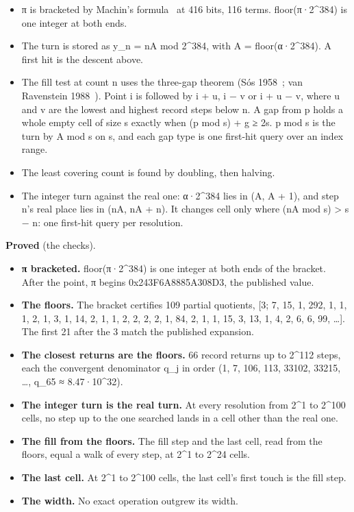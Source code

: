\begin{itemize}
\item π is bracketed by Machin's formula~\cite{src:Jones-1706} at 416 bits, 116 terms. floor(π·2\textasciicircum{}384) is one integer at both ends.
\item The turn is stored as y\_\allowbreak{}n = nA mod 2\textasciicircum{}384, with A = floor(α·2\textasciicircum{}384). A first hit is the descent above.
\item The fill test at count n uses the three-gap theorem (Sós 1958~\cite{src:S-s-1958}; van Ravenstein 1988~\cite{src:van-Ravenstein-1988}). Point i is followed by i + u, i − v or i + u − v, where u and v are the lowest and highest record steps below n. A gap from p holds a whole empty cell of size s exactly when (p mod s) + g ≥ 2s. p mod s is the turn by A mod s on s, and each gap type is one first-hit query over an index range.
\item The least covering count is found by doubling, then halving.
\item The integer turn against the real one: α·2\textasciicircum{}384 lies in (A, A + 1), and step n's real place lies in (nA, nA + n). It changes cell only where (nA mod s) > s − n: one first-hit query per resolution.
\end{itemize}

\textbf{Proved} (the checks).

\begin{itemize}
\item \textbf{π bracketed.} floor(π·2\textasciicircum{}384) is one integer at both ends of the bracket. After the point, π begins 0x243F6A8885A308D3, the published value.
\item \textbf{The floors.} The bracket certifies 109 partial quotients, [3; 7, 15, 1, 292, 1, 1, 1, 2, 1, 3, 1, 14, 2, 1, 1, 2, 2, 2, 2, 1, 84, 2, 1, 1, 15, 3, 13, 1, 4, 2, 6, 6, 99, …]. The first 21 after the 3 match the published expansion.
\item \textbf{The closest returns are the floors.} 66 record returns up to 2\textasciicircum{}112 steps, each the convergent denominator q\_\allowbreak{}j in order (1, 7, 106, 113, 33102, 33215, …, q\_\allowbreak{}65 ≈ 8.47·10\textasciicircum{}32).
\item \textbf{The integer turn is the real turn.} At every resolution from 2\textasciicircum{}1 to 2\textasciicircum{}100 cells, no step up to the one searched lands in a cell other than the real one.
\item \textbf{The fill from the floors.} The fill step and the last cell, read from the floors, equal a walk of every step, at 2\textasciicircum{}1 to 2\textasciicircum{}24 cells.
\item \textbf{The last cell.} At 2\textasciicircum{}1 to 2\textasciicircum{}100 cells, the last cell's first touch is the fill step.
\item \textbf{The width.} No exact operation outgrew its width.
\end{itemize}

